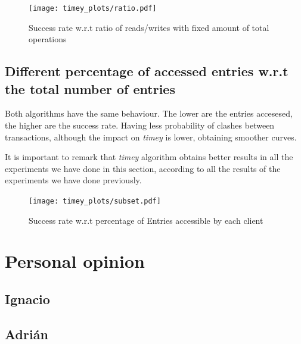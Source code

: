 \documentclass[a4paper, 10pt]{article}
\begin{document}
\begin{figure}[H]
  \centering
  \texttt{[image: timey\_plots/ratio.pdf]}
    \caption{Success rate w.r.t ratio of reads/writes with fixed amount of total operations}
    \label{timey:ratio}
\end{figure} 

\clearpage
\subsection{Different percentage of accessed entries w.r.t the total number of entries}

Both algorithms have the same behaviour. The lower are the entries accesesed, the higher are the success rate. Having less probability of clashes between transactions, although the impact on \textit{timey} is lower, obtaining smoother curves.

It is important to remark that \textit{timey} algorithm obtains better results in all the experiments we have done in this section, according to all the results of the experiments we have done previously.

\begin{figure}[H]
  \centering
  \texttt{[image: timey\_plots/subset.pdf]}
    \caption{Success rate w.r.t percentage of Entries accessible by each client}
    \label{timey:subset}
\end{figure} 

\clearpage
\section{Personal opinion}

\subsection{Ignacio}

\subsection{Adrián}
\end{document}
